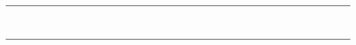 \begin{table}[htbp]
{\begin{tabular}{rrrrrrrrrrrrrrrrrrrrrrrrrrrrrrrrrrr}
 &  &  &  &  &  &  &  &  &  &  &  &  &  &  &  &  &  &  &  &  &  &  &  &  &  &  &  &  &  &  &  &  &  &  \\
 &  &  &  &  &  &  &  &  &  &  &  &  &  &  &  &  &  &  &  &  &  &  &  &  &  &  &  &  &  &  &  &  &  &  \\
 &  &  &  &  &  &  &  &  &  &  &  &  &  &  &  &  &  &  &  &  &  &  &  &  &  &  &  &  &  &  &  &  &  &  \\
 &  &  &  &  &  &  &  &  &  &  &  &  &  &  &  &  &  &  &  &  &  &  &  &  &  &  &  &  &  &  &  &  &  &  \\
 &  &  &  &  &  &  &  &  &  &  &  &  &  &  &  &  &  &  &  &  &  &  &  &  &  &  &  &  &  &  &  &  &  &  \\
 &  &  &  &  &  &  &  &  &  &  &  &  &  &  &  &  &  &  &  &  &  &  &  &  &  &  &  &  &  &  &  &  &  &  \\
 &  &  &  &  &  &  &  &  &  &  &  &  &  &  &  &  &  &  &  &  &  &  &  &  &  &  &  &  &  &  &  &  &  &  \\
 &  &  &  &  &  &  &  &  &  &  &  &  &  &  &  &  &  &  &  &  &  &  &  &  &  &  &  &  &  &  &  &  &  &  \\
 &  &  &  &  &  &  &  &  &  &  &  &  &  &  &  &  &  &  &  &  &  &  &  &  &  &  &  &  &  &  &  &  &  &  \\
\end{tabular}
}
\end{table}
